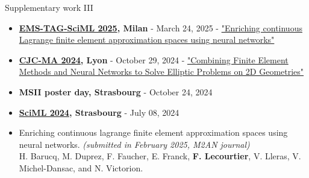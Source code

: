 \begin{frame}{Supplementary work III}
    \small
	\begin{tcolorbox}[
		skin=bicolor,
		colback=other, %
		colbacklower=other!20!white,
		title={Posters},
		arc=2mm, %
		boxrule=0.5pt, %
		breakable, enhanced jigsaw,
		width=\linewidth,
		opacityback=0.1
		]
		
        \begin{itemize}[\textcolor{other}{$\blacktriangleright$}]
            \item \textbf{\href{https://www.mate.polimi.it/events/EMS-TAG-SciML-25/index.php}{EMS-TAG-SciML 2025}, Milan} - March 24, 2025 - \href{https://flecourtier.github.io/these2023/these2023/1.0.3/_attachments/poster/2025_03_24.pdf}{"Enriching continuous Lagrange finite element approximation spaces using neural networks"} 
            \item \textbf{\href{https://cjc-ma2024.sciencesconf.org/program?lang=fr}{CJC-MA 2024}, Lyon} - October 29, 2024 - \href{https://flecourtier.github.io/these2023/these2023/1.0.3/_attachments/poster/2024_10_24.pdf}{"Combining Finite Element Methods and Neural Networks to Solve Elliptic Problems on 2D Geometries"}
            \item \textbf{MSII poster day, Strasbourg} - October 24, 2024 \\
			\item \textbf{\href{https://irma.math.unistra.fr/~micheldansac/SciML2024/participants.html}{SciML 2024}, Strasbourg} - July 08, 2024 \\
		\end{itemize}
	\end{tcolorbox}

    \normalsize
    \begin{tcolorbox}[
		skin=bicolor,
		colback=other, %
		colbacklower=other!20!white,
		title={Publications},
		arc=2mm, %
		boxrule=0.5pt, %
		breakable, enhanced jigsaw,
		width=\linewidth,
		opacityback=0.1
		]
		
		\begin{itemize}[\textcolor{other}{$\blacktriangleright$}]
			\item Enriching continuous lagrange finite element approximation spaces using neural networks. \textit{\small(submitted in February 2025, M2AN journal)} \\
			H. Barucq, M. Duprez, F. Faucher, E. Franck, \textbf{F. Lecourtier}, V. Lleras, V. Michel-Dansac, and N. Victorion.
		\end{itemize}
	\end{tcolorbox}
	
\end{frame}

